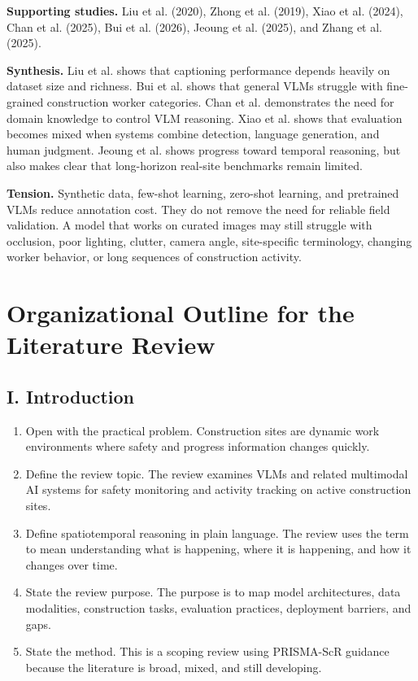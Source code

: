 \documentclass[10pt, letterpaper]{article}
\begin{document}
\textbf{Supporting studies.} Liu et al. (2020), Zhong et al. (2019), Xiao et al. (2024), Chan et al. (2025), Bui et al. (2026), Jeoung et al. (2025), and Zhang et al. (2025).

\textbf{Synthesis.} Liu et al. shows that captioning performance depends heavily on dataset size and richness. Bui et al. shows that general VLMs struggle with fine-grained construction worker categories. Chan et al. demonstrates the need for domain knowledge to control VLM reasoning. Xiao et al. shows that evaluation becomes mixed when systems combine detection, language generation, and human judgment. Jeoung et al. shows progress toward temporal reasoning, but also makes clear that long-horizon real-site benchmarks remain limited.

\textbf{Tension.} Synthetic data, few-shot learning, zero-shot learning, and pretrained VLMs reduce annotation cost. They do not remove the need for reliable field validation. A model that works on curated images may still struggle with occlusion, poor lighting, clutter, camera angle, site-specific terminology, changing worker behavior, or long sequences of construction activity.

\section{Organizational Outline for the Literature Review}

\subsection{I. Introduction}

\begin{enumerate}
\item Open with the practical problem. Construction sites are dynamic work environments where safety and progress information changes quickly.
\item Define the review topic. The review examines VLMs and related multimodal AI systems for safety monitoring and activity tracking on active construction sites.
\item Define spatiotemporal reasoning in plain language. The review uses the term to mean understanding what is happening, where it is happening, and how it changes over time.
\item State the review purpose. The purpose is to map model architectures, data modalities, construction tasks, evaluation practices, deployment barriers, and gaps.
\item State the method. This is a scoping review using PRISMA-ScR guidance because the literature is broad, mixed, and still developing.
\end{enumerate}
\end{document}
